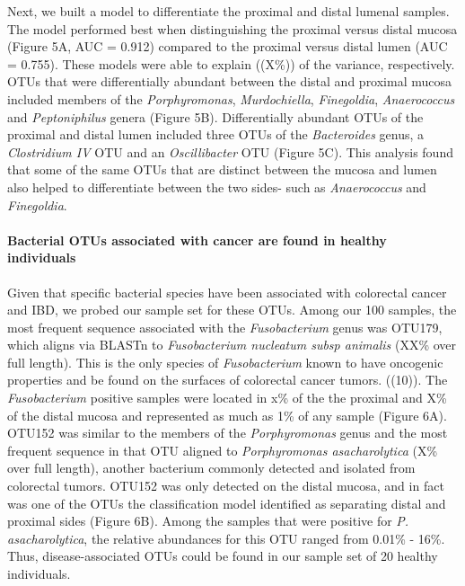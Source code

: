 \documentclass[11pt,]{article}
\let\oldparagraph\paragraph
\renewcommand{\paragraph}[1]{\oldparagraph{#1}\mbox{}}
\begin{document}
Next, we built a model to differentiate the proximal and distal lumenal
samples. The model performed best when distinguishing the proximal
versus distal mucosa (Figure 5A, AUC = 0.912) compared to the proximal
versus distal lumen (AUC = 0.755). These models were able to explain
((X\%)) of the variance, respectively. OTUs that were differentially
abundant between the distal and proximal mucosa included members of the
\emph{Porphyromonas}, \emph{Murdochiella}, \emph{Finegoldia},
\emph{Anaerococcus} and \emph{Peptoniphilus} genera (Figure 5B).
Differentially abundant OTUs of the proximal and distal lumen included
three OTUs of the \emph{Bacteroides} genus, a \emph{Clostridium IV} OTU
and an \emph{Oscillibacter} OTU (Figure 5C). This analysis found that
some of the same OTUs that are distinct between the mucosa and lumen
also helped to differentiate between the two sides- such as
\emph{Anaerococcus} and \emph{Finegoldia}.

\paragraph{Bacterial OTUs associated with cancer are found in healthy
individuals}\label{bacterial-otus-associated-with-cancer-are-found-in-healthy-individuals}

Given that specific bacterial species have been associated with
colorectal cancer and IBD, we probed our sample set for these OTUs.
Among our 100 samples, the most frequent sequence associated with the
\emph{Fusobacterium} genus was OTU179, which aligns via BLASTn to
\emph{Fusobacterium nucleatum subsp animalis} (XX\% over full length).
This is the only species of \emph{Fusobacterium} known to have oncogenic
properties and be found on the surfaces of colorectal cancer tumors.
((10)). The \emph{Fusobacterium} positive samples were located in x\% of
the the proximal and X\% of the distal mucosa and represented as much as
1\% of any sample (Figure 6A). OTU152 was similar to the members of the
\emph{Porphyromonas} genus and the most frequent sequence in that OTU
aligned to \emph{Porphyromonas asacharolytica} (X\% over full length),
another bacterium commonly detected and isolated from colorectal tumors.
OTU152 was only detected on the distal mucosa, and in fact was one of
the OTUs the classification model identified as separating distal and
proximal sides (Figure 6B). Among the samples that were positive for
\emph{P. asacharolytica}, the relative abundances for this OTU ranged
from 0.01\% - 16\%. Thus, disease-associated OTUs could be found in our
sample set of 20 healthy individuals.
\end{document}
